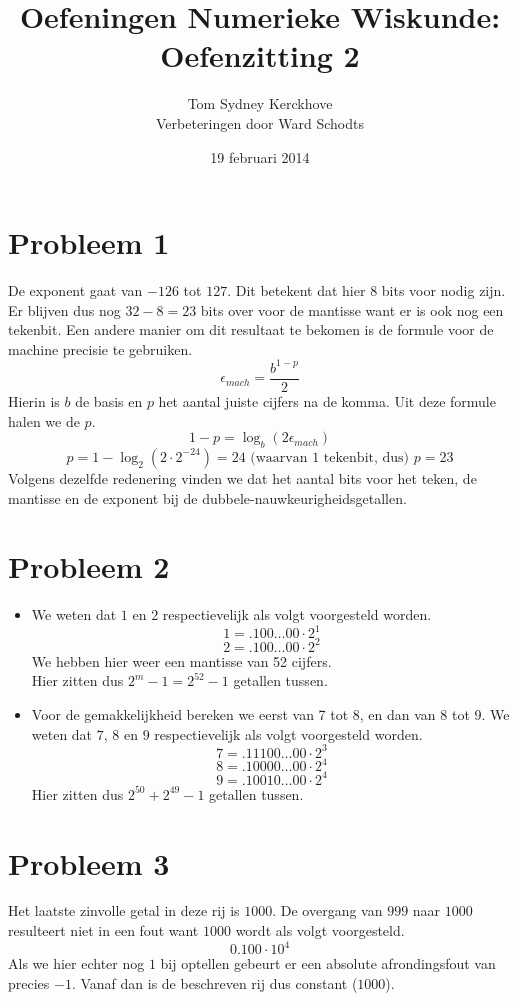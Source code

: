 \documentclass[12pt,a4paper]{article}
\author{Tom Sydney Kerckhove\\
		Verbeteringen door Ward Schodts}
\title{Oefeningen Numerieke Wiskunde:\\ Oefenzitting 2}
\date{19 februari 2014}
\begin{document}
\maketitle

\section{Probleem 1}
De exponent gaat van $-126$ tot $127$. Dit betekent dat hier $8$ bits voor nodig zijn. Er blijven dus nog $32-8 = 23$ bits over voor de mantisse want er is ook nog een tekenbit.
Een andere manier om dit resultaat te bekomen is de formule voor de machine precisie te gebruiken.
\[
\epsilon_{mach} = \frac{b^{1-p}}{2}
\]
Hierin is $b$ de basis en $p$ het aantal juiste cijfers na de komma.
Uit deze formule halen we de $p$.
\[
1-p=\log_{b}(2\epsilon_{mach})
\]
\[
p = 1-\log_{2}(2\cdot 2^{-24}) = 24 \text{ (waarvan 1 tekenbit, dus) } p = 23
\]
Volgens dezelfde redenering vinden we dat het aantal bits voor het teken, de mantisse en de exponent bij de dubbele-nauwkeurigheidsgetallen.

\section{Probleem 2}
\begin{itemize}
\item We weten dat $1$ en $2$ respectievelijk als volgt voorgesteld worden.
\[1 = .100\ldots00 \cdot 2^1\]
\[2 = .100\ldots00 \cdot 2^2\]
We hebben hier weer een mantisse van 52 cijfers.\\
Hier zitten dus $2^m-1=2^{52}-1$ getallen tussen.
\item Voor de gemakkelijkheid bereken we eerst van 7 tot 8, en dan van 8 tot 9. We weten dat $7$, $8$ en $9$ respectievelijk als volgt voorgesteld worden.
\[7 = .11100\ldots00 \cdot 2^3\]
\[8 = .10000\ldots00 \cdot 2^4\]
\[9 = .10010\ldots00 \cdot 2^4\]
Hier zitten dus $2^{50}+2^{49}-1$ getallen tussen.
\end{itemize}

\section{Probleem 3}
Het laatste zinvolle getal in deze rij is $1000$. De overgang van $999$ naar $1000$ resulteert niet in een fout want $1000$ wordt als volgt voorgesteld.
\[0.100 \cdot 10^4\]
Als we hier echter nog $1$ bij optellen gebeurt er een absolute afrondingsfout van precies $-1$. Vanaf dan is de beschreven rij dus constant ($1000$).
\end{document}
